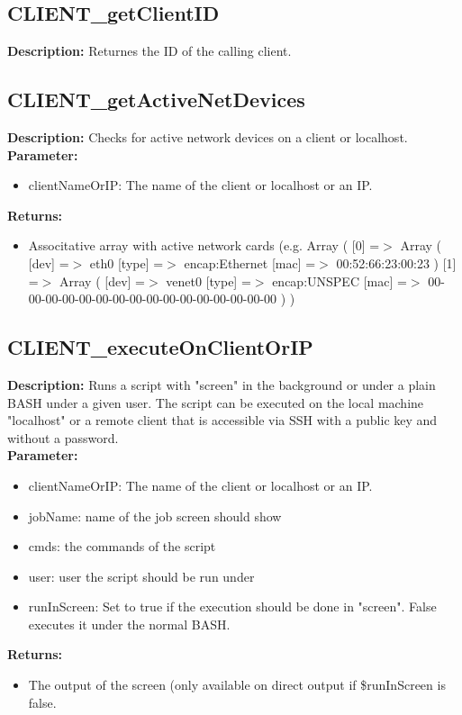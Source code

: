 \subsection{CLIENT\_getClientID}
\textbf{Description:} Returnes the ID of the calling client.\\

\subsection{CLIENT\_getActiveNetDevices}
\textbf{Description:} Checks for active network devices on a client or localhost.\\
\textbf{Parameter:}
\begin{itemize}
\item clientNameOrIP: The name of the client or localhost or an IP.
\end{itemize}
\textbf{Returns:}
\begin{itemize}
\item Associtative array with active network cards (e.g. Array ( [0] =$>$ Array ( [dev] =$>$ eth0 [type] =$>$ encap:Ethernet [mac] =$>$ 00:52:66:23:00:23 ) [1] =$>$ Array ( [dev] =$>$ venet0 [type] =$>$ encap:UNSPEC [mac] =$>$ 00-00-00-00-00-00-00-00-00-00-00-00-00-00-00-00 ) )
\end{itemize}

\subsection{CLIENT\_executeOnClientOrIP}
\textbf{Description:} Runs a script with "screen" in the background or under a plain BASH under a given user. The script can be executed on the local machine "localhost" or a remote client that is accessible via SSH with a public key and without a password.\\
\textbf{Parameter:}
\begin{itemize}
\item clientNameOrIP: The name of the client or localhost or an IP.
\item jobName: name of the job screen should show
\item cmds: the commands of the script 
\item user: user the script should be run under
\item runInScreen: Set to true if the execution should be done in "screen". False executes it under the normal BASH.
\end{itemize}
\textbf{Returns:}
\begin{itemize}
\item The output of the screen (only available on direct output if \$runInScreen is false.
\end{itemize}

